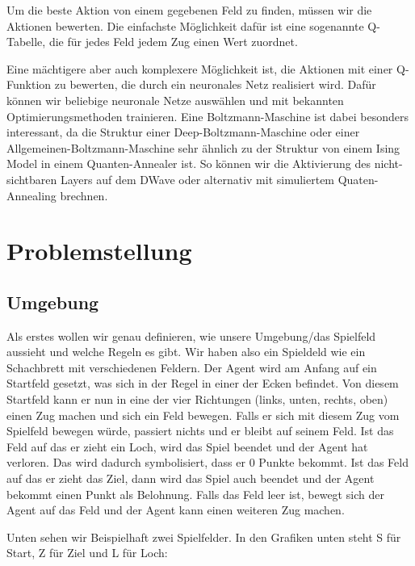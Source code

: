 Um die beste Aktion von einem gegebenen Feld zu finden, müssen wir die Aktionen bewerten. Die einfachste Möglichkeit dafür ist eine sogenannte Q-Tabelle, die für jedes Feld jedem Zug einen Wert zuordnet.

Eine mächtigere aber auch komplexere Möglichkeit ist, die Aktionen mit einer Q-Funktion zu bewerten, die durch ein neuronales Netz realisiert wird. Dafür können wir beliebige neuronale Netze auswählen und mit bekannten Optimierungsmethoden trainieren. Eine Boltzmann-Maschine ist dabei besonders interessant, da die Struktur einer Deep-Boltzmann-Maschine oder einer Allgemeinen-Boltzmann-Maschine sehr ähnlich zu der Struktur von einem Ising Model in einem Quanten-Annealer ist. So können wir die Aktivierung des nicht-sichtbaren Layers auf dem DWave oder alternativ mit simuliertem Quaten-Annealing brechnen.

\section{Problemstellung}
\label{sec:prob}

\subsection{Umgebung}
\label{subsec:umg}

Als erstes wollen wir genau definieren, wie unsere Umgebung/das Spielfeld aussieht und welche Regeln es gibt. Wir haben also ein Spieldeld wie ein Schachbrett mit verschiedenen Feldern. Der Agent wird am Anfang auf ein Startfeld gesetzt, was sich in der Regel in einer der Ecken befindet. Von diesem Startfeld kann er nun in eine der vier Richtungen (links, unten, rechts, oben) einen Zug machen und sich ein Feld bewegen. Falls er sich mit diesem Zug vom Spielfeld bewegen würde, passiert nichts und er bleibt auf seinem Feld. Ist das Feld auf das er zieht ein Loch, wird das Spiel beendet und der Agent hat verloren. Das wird dadurch symbolisiert, dass er 0 Punkte bekommt. Ist das Feld auf das er zieht das Ziel, dann wird das Spiel auch beendet und der Agent bekommt einen Punkt als Belohnung. Falls das Feld leer ist, bewegt sich der Agent auf das Feld und der Agent kann einen weiteren Zug machen.

Unten sehen wir Beispielhaft zwei Spielfelder. In den Grafiken unten steht S für Start, Z für Ziel und L für Loch:

